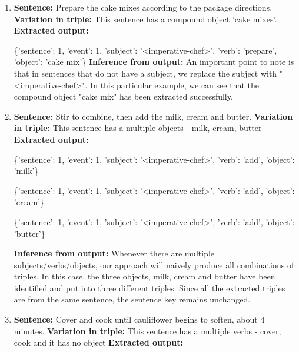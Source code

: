 \documentclass[11pt,letterpaper]{article}
\begin{document}
\begin{enumerate}
    \item
    \textbf{Sentence:} Prepare the cake mixes according to the package directions. \newline
    \textbf{Variation in triple:} This sentence has a compound object 'cake mixes'.
    \newline
    \textbf{Extracted output:} 
    
    \{'sentence': 1, 'event': 1, 'subject': '<imperative-chef>', 'verb': 'prepare', 'object': 'cake mix'\}
    \newline
    \textbf{Inference from output:} 
    An important point to note is that in sentences that do not have a subject, we replace the subject with "<imperative-chef>". In this particular example, we can see that the compound object "cake mix" has been extracted successfully.
    
    \item
    \textbf{Sentence:} Stir to combine, then add the milk, cream and butter.
    \newline
    \textbf{Variation in triple:} This sentence has a multiple objects - milk, cream, butter
    \newline
    \textbf{Extracted output:} 
    
    \{'sentence': 1, 'event': 1, 'subject': '<imperative-chef>', 'verb': 'add', 'object': 'milk'\}
    
    \{'sentence': 1, 'event': 1, 'subject': '<imperative-chef>', 'verb': 'add', 'object': 'cream'\}
    
    \{'sentence': 1, 'event': 1, 'subject': '<imperative-chef>', 'verb': 'add', 'object': 'butter'\}
    
    \textbf{Inference from output:} 
    Whenever there are multiple subjects/verbs/objects, our approach will naively produce all combinations of triples. In this case, the three objects, milk, cream and butter have been identified and put into three different triples. Since all the extracted triples are from the same sentence, the sentence key remains unchanged.
    
    \item
    \textbf{Sentence:} Cover and cook until cauliflower begins to soften, about 4 minutes.
    \newline
    \textbf{Variation in triple:} This sentence has a multiple verbs - cover, cook and it has no object
    \newline
    \textbf{Extracted output:} 
    

\end{enumerate}
\end{document}
